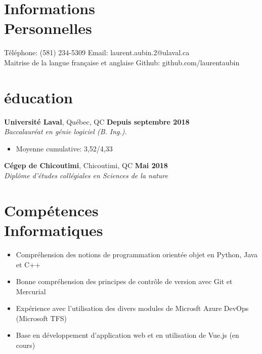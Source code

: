 \documentclass[margin,line]{resume}
\begin{document}
\begin{resume}
    \section{\mysidestyle Informations\\Personnelles}

    Téléphone: (581) 234-5309     \hfill \noindent Email: laurent.aubin.2@ulaval.ca \\
    Maitrise de la langue française et anglaise \hfill \noindent Github: github.com/laurentaubin
    

    \section{\mysidestyle éducation}

    \textbf{Université Laval}, Québec, QC \hfill \textbf{Depuis septembre 2018} \vspace{2mm}\\\vspace{1mm}%
    \textsl{Baccalauréat en génie logiciel (B. Ing.).}
    \begin{itemize}[nosep]
        \item Moyenne cumulative: 3,52/4,33
    \end{itemize}
    
      \textbf{Cégep de Chicoutimi}, Chicoutimi, QC \hfill \textbf{Mai 2018} \vspace{2mm}\\\vspace{1mm}%
    \textsl{Diplôme d'études collégiales en Sciences de la nature} 
  
    
    \section{\mysidestyle Compétences\\Informatiques}
     \begin{itemize}[nosep]
        \item Compréhension des notions de programmation orientée objet en Python, Java et C++
        \item Bonne compréhension des principes de contrôle de version avec Git et Mercurial
        \item Expérience avec l'utilisation des divers modules de Microsft Azure DevOps (Microsoft TFS)
        \item Base en développement d'application web et en utilisation de Vue.js (en cours)
    \end{itemize}
    

\end{resume}
\end{document}
